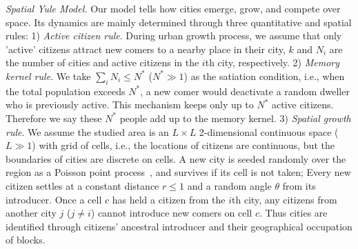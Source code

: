 \documentclass[reprint,unsortedaddress,amsmath,amssymb,aps,prl,showkeys]{revtex4-2}
\begin{document}

\textit{Spatial Yule Model.} Our model tells how cities emerge, grow, and compete over space. Its dynamics are mainly determined through three quantitative and spatial rules: 1) \textit{Active citizen rule}. During urban growth process, we assume that only 'active' citizens attract new comers to a nearby place in their city, $k$ and $N_i$ are the number of cities and active citizens in the $i$th city, respectively. 2) \textit{Memory kernel rule}. We take $\sum_{i} N_i \le N^*$ ($N^* \gg 1$) as the satiation condition, i.e., when the total population exceeds $N^*$, a new comer would deactivate a random dweller who is previously active. This mechanism keeps only up to $N^*$ active citizens. Therefore we say these $N^*$ people add up to the memory kernel. 3) \emph{Spatial growth rule}. We assume the studied area is an $L\times L$ 2-dimensional continuous space ($L\gg 1$) with grid of cells, %
i.e., the locations of citizens are continuous, but the boundaries of cities are discrete on cells. A new city is seeded randomly over the region as a Poisson point process~\cite{miles1970homogeneous}, and survives if its cell is not taken; Every new citizen settles at a constant distance $r\le 1$ and a random angle $\theta$ from its introducer. Once a cell $c$ has held a citizen from the $i$th city, any citizens from another city $j$ ($j\ne i$) cannot introduce new comers on cell $c$. Thus cities are identified through citizens' ancestral introducer and their geographical occupation of blocks.
\end{document}
